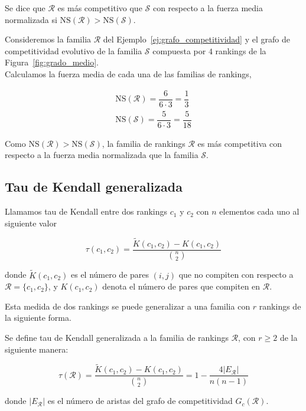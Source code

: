 \begin{defi}
Se dice que $\mathcal{R}$ es más competitivo que $\mathcal{S}$ con respecto a la fuerza media normalizada si $\mathrm{NS}(\mathcal{R}) > \mathrm{NS}(\mathcal{S})$.
\end{defi}

\begin{ejemplo}
Consideremos la familia $\mathcal{R}$ del Ejemplo~\ref{ej:grafo_competitividad} y el grafo de competitividad evolutivo de la familia $\mathcal{S}$ compuesta por $4$ rankings de la Figura~\ref{fig:grado_medio}.\\

Calculamos la fuerza media de cada una de las familias de rankings,

\begin{eqnarray*}
\mathrm{NS}(\mathcal{R}) = \dfrac{6}{6 \cdot 3} = \dfrac{1}{3}\\
\mathrm{NS}(\mathcal{S}) = \dfrac{5}{6 \cdot 3} = \dfrac{5}{18}
\end{eqnarray*}

Como $\mathrm{NS}(\mathcal{R}) > \mathrm{NS}(\mathcal{S})$, la familia de rankings $\mathcal{R}$ es más competitiva con respecto a la fuerza media normalizada que la familia $\mathcal{S}$.

\end{ejemplo}

\subsection*{Tau de Kendall generalizada}

\begin{defi}
Llamamos tau de Kendall entre dos rankings $c_1$ y $c_2$ con $n$ elementos cada uno al siguiente valor

\begin{equation}
\tau(c_1, c_2) = \dfrac{\tilde{K}(c_1, c_2) - K(c_1, c_2)}{\binom{n}{2}}
\end{equation} 

donde $\tilde{K}(c_1, c_2)$ es el número de pares $(i,j)$ que no compiten con respecto a $\mathcal{R} = \{c_1, c_2\}$, y $K(c_1, c_2)$ denota el número de pares que compiten en $\mathcal{R}$.
\end{defi}

Esta medida de dos rankings se puede generalizar a una familia con $r$ rankings de la siguiente forma.

\begin{defi}
Se define tau de Kendall generalizada a la familia de rankings $\mathcal{R}$, con $r \geq 2$ de la siguiente manera:

\begin{equation}
\tau(\mathcal{R}) = \dfrac{\tilde{K}(c_1, c_2) - K(c_1, c_2)}{\binom{n}{2}} = 1 - \dfrac{4 |E_\mathcal{R}|}{n(n-1)}
\end{equation}

donde $|E_\mathcal{R}|$ es el número de aristas del grafo de competitividad $G_c(\mathcal{R})$.
\end{defi}

